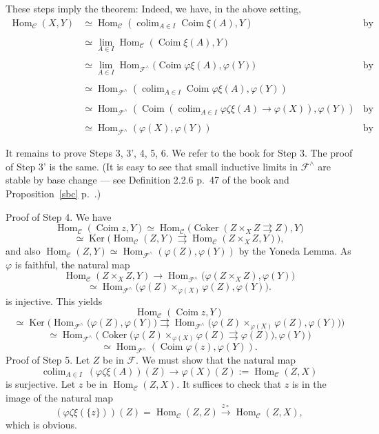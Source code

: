 \documentclass[12pt]{article}%
\theoremstyle{remark}
\theoremstyle{definition}
\newcommand{\C}{\mathcal C}
\newcommand{\F}{\mathcal F}
\DeclareMathOperator*{\colim}{colim}
\DeclareMathOperator{\Coim}{Coim}
\DeclareMathOperator{\Coker}{Coker}
\DeclareMathOperator{\Hom}{Hom}%
\DeclareMathOperator{\Ker}{Ker}
\begin{document}
These steps imply the theorem: Indeed, we have, in the above setting, 
%
\begin{align*} 
%
\Hom_\C(X,Y)&\simeq\Hom_\C\left(\colim_{A\in I}\Coim\xi(A),Y\right)&\text{by Step 6}\\ \\ 
%
&\simeq\lim_{A\in I}\Hom_\C(\Coim\xi(A),Y)\\ \\ 
%
&\simeq\lim_{A\in I}\Hom_{\F^\wedge}\Big(\Coim\varphi\xi(A),\varphi(Y)\Big)&\text{by Step 4}\\ \\ 
%
&\simeq\Hom_{\F^\wedge}\left(\colim_{A\in I}\Coim\varphi\xi(A),\varphi(Y)\right)\\ \\ 
%
&\simeq\Hom_{\F^\wedge}\left(\Coim\left(\colim_{A\in I}\varphi\zeta\xi(A)\to\varphi(X)\right),\varphi(Y)\right)&\text{by Step 3'}\\ \\ 
%
&\simeq\Hom_{\F^\wedge}(\varphi(X),\varphi(Y))&\text{by Step 5.}
%
\end{align*} 
%

It remains to prove Steps 3, 3', 4, 5, 6. We refer to the book for Step 3. The proof of Step 3' is the same. (It is easy to see that small inductive limits in $\F^\wedge$ are stable by base change --- see Definition 2.2.6 p.~47 of the book and Proposition~\ref{sbc} p.~\pageref{sbc}.) 

\noindent Proof of Step 4. We have 
$$
\Hom_\C(\Coim z,Y)\simeq\Hom_\C\big(\Coker(Z\times_XZ\rightrightarrows Z),Y\big)
$$
$$
\simeq\Ker\big(\Hom_\C(Z,Y)\rightrightarrows\Hom_\C(Z\times_XZ,Y)\big),
$$ 
and also $\Hom_\C(Z,Y)\simeq\Hom_{\F^\wedge}(\varphi(Z),\varphi(Y))$ by the Yoneda Lemma. As $\varphi$ is faithful, the natural map 
$$
\Hom_\C(Z\times_XZ,Y)\to\Hom_{\F^\wedge}\big(\varphi(Z\times_XZ),\varphi(Y)\big)
$$
$$
\simeq\Hom_{\F^\wedge}\big(\varphi(Z)\times_{\varphi(X)}\varphi(Z),\varphi(Y)\big).
$$ 
is injective. This yields 
$$
\Hom_\C(\Coim z,Y)
$$
$$
\simeq\Ker\Big(\Hom_{\F^\wedge}\big(\varphi(Z),\varphi(Y)\big)\rightrightarrows\Hom_{\F^\wedge}\big(\varphi(Z)\times_{\varphi(X)}\varphi(Z),\varphi(Y)\big)\Big)
$$
$$
\simeq\Hom_{\F^\wedge}\Big(\Coker\big(\varphi(Z)\times_{\varphi(X)}\varphi(Z)\rightrightarrows\varphi(Z)\big),\varphi(Y)\Big)
$$
$$
\simeq\Hom_{\F^\wedge}(\Coim\varphi(z),\varphi(Y)).
$$
Proof of Step 5. Let $Z$ be in $\F$. We must show that the natural map 
$$
\colim_{A\in I}\ (\varphi\zeta\xi(A))(Z)\to\varphi(X)(Z):=\Hom_\C(Z,X) 
$$
is surjective. Let $z$ be in $\Hom_\C(Z,X)$. It suffices to check that $z$ is in the image of the natural map 
$$
(\varphi\zeta\xi(\{z\}))(Z)=\Hom_\C(Z,Z)\xrightarrow{z\circ}\Hom_\C(Z,X),
$$
which is obvious. 
\end{document}
